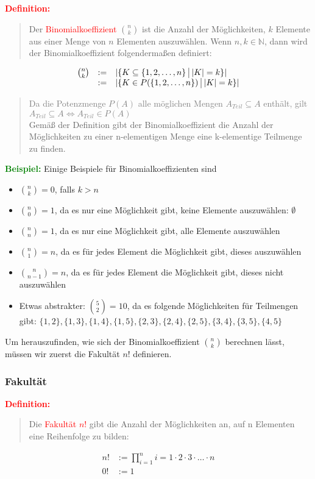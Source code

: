 \documentclass{article}
\newcommand{\smsp}{\phantom{\hspace{3px}}}
\newcommand{\red}[1]{\textcolor{red}{#1}}
\newcommand{\gray}[1]{\textcolor{gray}{#1}}
\newcommand{\green}[1]{\textcolor{green}{#1}}
\newcommand{\ex}{\green{\textbf{Beispiel: }}}
\newcommand{\de}[1]{\red{\textbf{Definition: }}\begin{quote}#1\end{quote}}
\newcommand{\N}{\mathbb{N}}
\newcommand{\vst}{\smsp \vline \smsp}
\begin{document}
\de{Der \red{Binomialkoeffizient} $\binom{n}{k}$ ist die Anzahl der Möglichkeiten, $k$ Elemente aus einer Menge von $n$ Elementen auszuwählen. Wenn $n, k \in \N$, dann wird der Binomialkoeffizient folgendermaßen definiert:}
\begin{equation*}
    \begin{array}{lcl}
        \binom{n}{k} & := & |\{K \subseteq \{1, 2, \dots, n\} \vst |K| = k\}|\\
                     & := & |\{K \in P(\{1, 2, \dots, n\}) \vst |K| = k\}|
    \end{array}
\end{equation*}
\begin{quote}
    \gray{Da die Potenzmenge $P(A)$ alle möglichen Mengen $A_{Teil} \subseteq A$ enthält, gilt $A_{Teil} \subseteq A \iff A_{Teil} \in P(A)$}\\
    Gemäß der Definition gibt der Binomialkoeffizient die Anzahl der Möglichkeiten zu einer n-elementigen Menge eine k-elementige Teilmenge zu finden.
\end{quote}

\ex Einige Beispiele für Binomialkoeffizienten sind
\begin{itemize}
    \item $\binom{n}{k} = 0$, falls $k > n$
    \item $\binom{n}{0} = 1$, da es nur eine Möglichkeit gibt, keine Elemente auszuwählen: $\emptyset$
    \item $\binom{n}{n} = 1$, da es nur eine Möglichkeit gibt, alle Elemente auszuwählen
    \item $\binom{n}{1} = n$, da es für jedes Element die Möglichkeit gibt, dieses auszuwählen
    \item $\binom{n}{n-1} = n$, da es für jedes Element die Möglichkeit gibt, dieses nicht auszuwählen
    \item Etwas abstrakter: $\binom{5}{2} = 10$, da es folgende Möglichkeiten für Teilmengen gibt: $\{1, 2\}, \{1, 3\}, \{1, 4\}, \{1, 5\}, \{2, 3\}, \{2, 4\}, \{2, 5\}, \{3, 4\}, \{3, 5\}, \{4, 5\}$
\end{itemize}
Um herauszufinden, wie sich der Binomialkoeffizient $\binom{n}{k}$ berechnen lässt, müssen wir zuerst die Fakultät $n!$ definieren.

\subsubsection{Fakultät}
\de{Die \red{Fakultät $n!$} gibt die Anzahl der Möglichkeiten an, auf n Elementen eine Reihenfolge zu bilden:}
\begin{equation*}
    \begin{aligned}
        n! &:= \prod_{i=1}^{n} i = 1 \cdot 2 \cdot 3 \cdot \dots \cdot n\\
        0! &:=  1
    \end{aligned}
\end{equation*}
\end{document}
